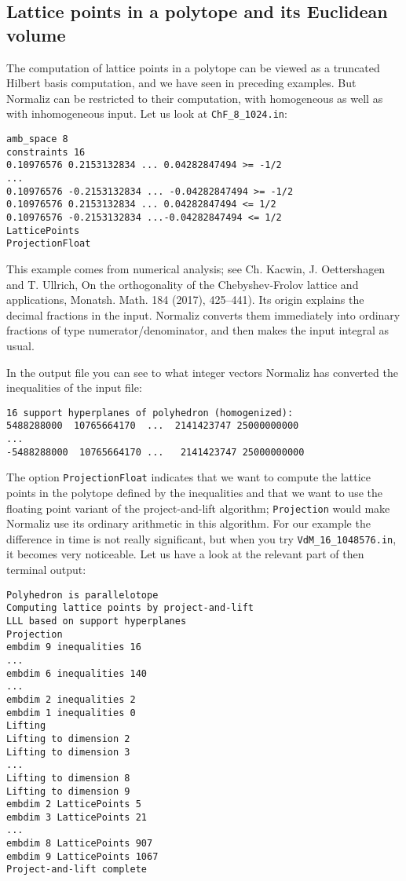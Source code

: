 \documentclass[12pt,a4paper]{scrartcl}
\theoremstyle{definition}
\begin{document}
\subsection{Lattice points in a polytope and its Euclidean volume}\label{project_example}

The computation of lattice points in a polytope can be viewed as a truncated Hilbert basis computation, and we have seen in preceding examples. But Normaliz can be restricted to their computation, with homogeneous as well as with inhomogeneous input. Let us look at \verb|ChF_8_1024.in|:

\begin{Verbatim}
amb_space 8
constraints 16
0.10976576 0.2153132834 ... 0.04282847494 >= -1/2
...
0.10976576 -0.2153132834 ... -0.04282847494 >= -1/2
0.10976576 0.2153132834 ... 0.04282847494 <= 1/2
0.10976576 -0.2153132834 ...-0.04282847494 <= 1/2
LatticePoints
ProjectionFloat
\end{Verbatim}

This example comes from numerical analysis; see Ch. Kacwin, J. Oettershagen and T. Ullrich, On the orthogonality of the Chebyshev-Frolov lattice and applications, Monatsh. Math. 184 (2017), 425--441). Its origin explains the decimal fractions in the input. Normaliz converts them immediately into ordinary fractions of type numerator/denominator, and then makes the input integral as usual.

In the output file you can see to what integer vectors Normaliz has converted the inequalities of the input file:
\begin{Verbatim}
16 support hyperplanes of polyhedron (homogenized):
5488288000  10765664170  ...  2141423747 25000000000
...
-5488288000  10765664170 ...   2141423747 25000000000
\end{Verbatim}

The option \verb|ProjectionFloat| indicates that we want to compute the lattice points in the polytope defined by the inequalities and that we want to use the floating point variant of the project-and-lift algorithm; \verb|Projection| would make Normaliz use its ordinary arithmetic in this algorithm. For our example the difference in time is not really significant, but when you try \verb|VdM_16_1048576.in|, it becomes very noticeable. Let us have a look at the relevant part of then terminal output:
\begin{Verbatim}
Polyhedron is parallelotope
Computing lattice points by project-and-lift
LLL based on support hyperplanes
Projection
embdim 9 inequalities 16
...
embdim 6 inequalities 140
...
embdim 2 inequalities 2
embdim 1 inequalities 0
Lifting
Lifting to dimension 2
Lifting to dimension 3
...
Lifting to dimension 8
Lifting to dimension 9
embdim 2 LatticePoints 5
embdim 3 LatticePoints 21
...
embdim 8 LatticePoints 907
embdim 9 LatticePoints 1067
Project-and-lift complete
\end{Verbatim}
\end{document}
